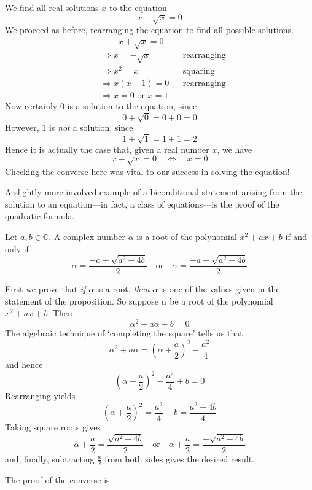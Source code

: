 \begin{example}
\label{exSolveSqrtSecondExample}
We find all real solutions $x$ to the equation
\[
x+\sqrt{x}=0
\]
We proceed as before, rearranging the equation to find all possible solutions.
\begin{align*}
&\phantom{\Rightarrow\;\;} x+\sqrt{x} = 0 && \\
&\Rightarrow x=-\sqrt{x} && \text{rearranging} \\
&\Rightarrow x^2=x && \text{squaring} \\
&\Rightarrow x(x-1)=0 && \text{rearranging} \\
&\Rightarrow x=0 \text{ or } x=1 && 
\end{align*}
Now certainly $0$ is a solution to the equation, since
\[
0+\sqrt{0} = 0+0 = 0
\]
However, $1$ is \textit{not} a solution, since
\[
1+\sqrt{1} = 1+1 = 2
\]
Hence it is actually the case that, given a real number $x$, we have
\[
x+\sqrt{x} = 0 \quad \Leftrightarrow \quad x=0
\]
Checking the converse here was vital to our success in solving the equation!
\end{example}

A slightly more involved example of a biconditional statement arising from the solution to an equation---in fact, a class of equations---is the proof of the quadratic formula.

\begin{itheorem}
\label{thmQuadraticFormula}
Let $a,b \in \mathbb{C}$. A complex number $\alpha$ is a root of the polynomial $x^2+ax+b$ if and only if
\[
\alpha = \frac{-a+\sqrt{a^2-4b}}{2} \quad \text{or} \quad \alpha =\frac{-a-\sqrt{a^2-4b}}{2}
\]
\end{itheorem}

\begin{cproof}
First we prove that \textit{if} $\alpha$ is a root, \textit{then} $\alpha$ is one of the values given in the statement of the proposition. So suppose $\alpha$ be a root of the polynomial $x^2+ax+b$. Then
\[
\alpha^2 + a\alpha + b = 0
\]
The algebraic technique of `completing the square' tells us that
\[
\alpha^2 + a\alpha = \left( \alpha + \frac{a}{2} \right)^2 - \frac{a^2}{4}
\]
and hence
\[
\left( \alpha + \frac{a}{2} \right)^2 - \frac{a^2}{4} + b = 0
\]
Rearranging yields
\[
\left( \alpha + \frac{a}{2} \right)^2  = \frac{a^2}{4} - b = \frac{a^2-4b}{4}
\]
Taking square roots gives
\[
\alpha + \frac{a}{2} = \frac{\sqrt{a^2-4b}}{2} \quad \text{or} \quad \alpha + \frac{a}{2} = \frac{-\sqrt{a^2-4b}}{2}
\]
and, finally, subtracting $\frac{a}{2}$ from both sides gives the desired result.

The proof of the converse is .
\end{cproof}

